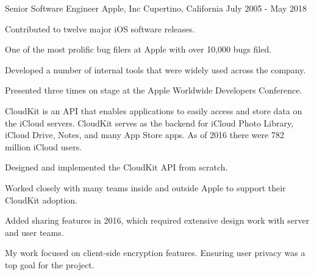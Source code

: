 

\begin{cventries}

  \cventry
    {Senior Software Engineer} %
    {Apple, Inc} %
    {Cupertino, California} %
    {July 2005 - May 2018} %
    {
    \vspace{-2.0mm}
        	\begin{cvitems}
         	\item {Contributed to twelve major iOS software releases.}
         	\item {One of the most prolific bug filers at Apple with over 10,000 bugs filed.}
         	\item {Developed a number of internal tools that were widely used across the company.}
		\item {Presented three times on stage at the Apple Worldwide Developers Conference.}
          \end{cvitems}
	\begin{cvsubentries}
       		{CloudKit is an API that enables applications to easily access and store data on the iCloud servers. \newline
		CloudKit serves as the backend for iCloud Photo Library, iCloud Drive, Notes, and many App Store apps. As of 2016 there were 782 million iCloud users.
		\vspace{2.0mm}
		\begin{cvitems}
         		\item {Designed and implemented the CloudKit API from scratch.}
         		\item {Worked closely with many teams inside and outside Apple to support their CloudKit adoption.}
         		\item {Added sharing features in 2016, which required extensive design work with server and user teams.}
			\item {My work focused on client-side encryption features. Ensuring user privacy was a top goal for the project.}
         	 \end{cvitems}
}
\end{cvsubentries}}
\end{cventries}
